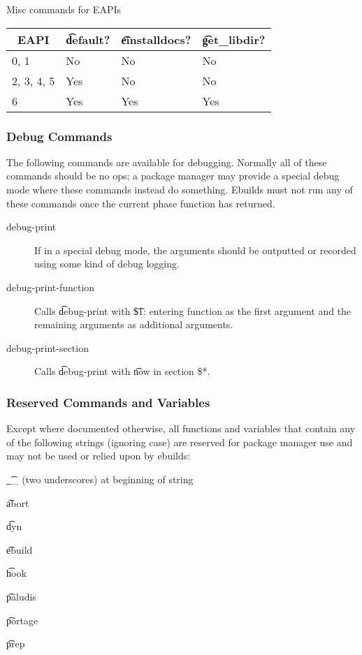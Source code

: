 \begin{centertable}{Misc commands for EAPIs}
    \label{tab:misc-commands}
    \begin{tabular}{llll}
      \toprule
      \multicolumn{1}{c}{\textbf{EAPI}} &
      \multicolumn{1}{c}{\textbf{\t{default}?}} &
      \multicolumn{1}{c}{\textbf{\t{einstalldocs}?}} &
      \multicolumn{1}{c}{\textbf{\t{get\_libdir}?}} \\
      \midrule
      0, 1              & No  & No  & No  \\
      2, 3, 4, 5        & Yes & No  & No  \\
      6                 & Yes & Yes & Yes \\
      \bottomrule
    \end{tabular}
\end{centertable}

\subsubsection{Debug Commands}
The following commands are available for debugging. Normally all of these commands should be no ops;
a package manager may provide a special debug mode where these commands instead do something.
Ebuilds must not run any of these commands once the current phase function has returned.

\begin{description}
\item[debug-print] If in a special debug mode, the arguments should be outputted or recorded using
    some kind of debug logging.
\item[debug-print-function] Calls \t{debug-print} with \t{\$1: entering function} as the first
    argument and the remaining arguments as additional arguments.
\item[debug-print-section] Calls \t{debug-print} with \t{now in section \$*}.
\end{description}

\subsubsection{Reserved Commands and Variables}

Except where documented otherwise, all functions and variables that contain any of the following
strings (ignoring case) are reserved for package manager use and may not be used or relied upon by
ebuilds:

\begin{compactitem}
\item \t{\_\_} (two underscores) at beginning of string
\item \t{abort}
\item \t{dyn}
\item \t{ebuild}
\item \t{hook}
\item \t{paludis}
\item \t{portage}
\item \t{prep}
\end{compactitem}


